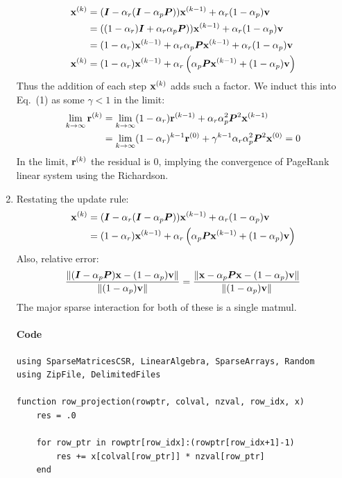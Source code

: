 \documentclass[]{exam}
\let\oldparagraph\paragraph
\renewcommand{\paragraph}[1]{\oldparagraph{#1}\mbox{}}
\begin{document}
\begin{questions}
\begin{enumerate}[label=\arabic*.]
\begin{align*}
			\boldsymbol{\mathrm{x}}^{(k)} &= (\boldsymbol{I} - \alpha_r(\boldsymbol{I} - \alpha_p \boldsymbol{P})) \boldsymbol{\mathrm{x}}^{(k - 1)} + \alpha_r (1 - \alpha_p) \boldsymbol{\mathrm{v}} \\
			&= ((1 - \alpha_r) \boldsymbol{I} + \alpha_r \alpha_p \boldsymbol{P})) \boldsymbol{\mathrm{x}}^{(k - 1)} + \alpha_r (1 - \alpha_p) \boldsymbol{\mathrm{v}} \\
			&= (1 - \alpha_r) \boldsymbol{\mathrm{x}}^{(k - 1)} + \alpha_r \alpha_p \boldsymbol{P} \boldsymbol{\mathrm{x}}^{(k - 1)} + \alpha_r (1 - \alpha_p) \boldsymbol{\mathrm{v}} \\
			\boldsymbol{\mathrm{x}}^{(k)}&= (1 - \alpha_r) \boldsymbol{\mathrm{x}}^{(k - 1)} + \alpha_r \left( \alpha_p \boldsymbol{P} \boldsymbol{\mathrm{x}}^{(k - 1)} + (1 - \alpha_p) \boldsymbol{\mathrm{v}} \right)
		\end{align*}
		Thus the addition of each step $\boldsymbol{\mathrm{x}}^{(k)}$ adds such a factor. We induct this into Eq.~(1) as some $\gamma < 1$ in the limit:
		\begin{align*}
			\lim_{k \rightarrow \infty} \boldsymbol{\mathrm{r}}^{(k)} &= \lim_{k \rightarrow \infty} (1 - \alpha_r) \boldsymbol{\mathrm{r}}^{(k - 1)} + \alpha_r \alpha_p^2 \boldsymbol{P}^2 \boldsymbol{\mathrm{x}}^{(k-1)} \\
			&= \lim_{k \rightarrow \infty} (1 - \alpha_r)^{k-1} \boldsymbol{\mathrm{r}}^{(0)} + \gamma^{k - 1} \alpha_r \alpha_p^2 \boldsymbol{P}^2 \boldsymbol{\mathrm{x}}^{(0)}
			= 0
		\end{align*}
		In the limit, $\boldsymbol{\mathrm{r}}^{(k)}$ the residual is 0, implying the convergence of PageRank linear system using the Richardson.
	\item Restating the update rule:
		\begin{align*}
			\boldsymbol{\mathrm{x}}^{(k)} &= (\boldsymbol{I} - \alpha_r(\boldsymbol{I} - \alpha_p \boldsymbol{P})) \boldsymbol{\mathrm{x}}^{(k - 1)} + \alpha_r (1 - \alpha_p) \boldsymbol{\mathrm{v}} \\
			&= (1 - \alpha_r) \boldsymbol{\mathrm{x}}^{(k - 1)} + \alpha_r \left( \alpha_p \boldsymbol{P} \boldsymbol{\mathrm{x}}^{(k - 1)} + (1 - \alpha_p) \boldsymbol{\mathrm{v}} \right)
		\end{align*}
		Also, relative error:
		\begin{align*}
			\frac{\|(\boldsymbol{I} - \alpha_p \boldsymbol{P}) \boldsymbol{\mathrm{x}} - (1 - \alpha_p)\boldsymbol{\mathrm{v}} \|}{\| (1 - \alpha_p) \boldsymbol{\mathrm{v}} \|} = \frac{\|\boldsymbol{\mathrm{x}} - \alpha_p \boldsymbol{P} \boldsymbol{\mathrm{x}} - (1 - \alpha_p)\boldsymbol{\mathrm{v}} \|}{\| (1 - \alpha_p) \boldsymbol{\mathrm{v}} \|}
		\end{align*}
		The major sparse interaction for both of these is a single matmul.
		\paragraph{Code}
		\begin{lstlisting}
using SparseMatricesCSR, LinearAlgebra, SparseArrays, Random
using ZipFile, DelimitedFiles

function row_projection(rowptr, colval, nzval, row_idx, x)
	res = .0

	for row_ptr in rowptr[row_idx]:(rowptr[row_idx+1]-1)
		res += x[colval[row_ptr]] * nzval[row_ptr]
	end


\end{lstlisting}
\end{enumerate}
\end{questions}
\end{document}
